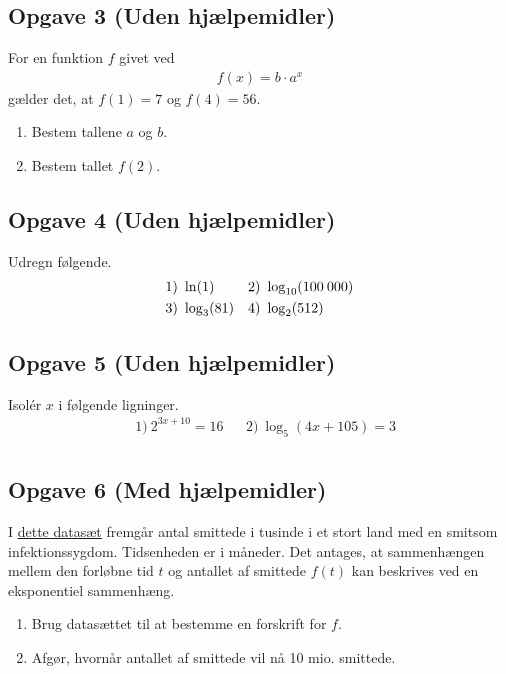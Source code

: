\documentclass[12pt]{article}
\begin{document}
\subsection*{Opgave 3 (Uden hjælpemidler)}

For en funktion $f$ givet ved 
\begin{align*}
	f(x) = b\cdot a^x
\end{align*}
gælder det, at $f(1) = 7$ og $f(4) = 56$.
\begin{enumerate}[label=\roman*)]
	\item Bestem tallene $a$ og $b$. 
	\item Bestem tallet $f(2)$.
\end{enumerate}

\subsection*{Opgave 4 (Uden hjælpemidler)}

Udregn følgende.
\begin{align*}
	&1) \   \ln(1)  &  &2) \ \log_{10}(100\hspace{0.8mm} 000)\\
	&3) \ \log_3(81)  &  &4) \ \log_{2}(512) 
\end{align*}

\subsection*{Opgave 5 (Uden hjælpemidler)}

Isolér $x$ i følgende ligninger.
\begin{align*}
	&1) \ 2^{3x + 10} = 16 &&2) \ \log_5(4x + 105) = 3 \\
\end{align*}
\subsection*{Opgave 6 (Med hjælpemidler)}

I \href{https://github.com/ChristianJLex/TeachingNotes/raw/master/2024-2025/Data og lign/Smittetal.xlsx}{\color{blue!60} dette datasæt} fremgår antal smittede i tusinde i et stort land med en smitsom infektionssygdom. Tidsenheden er i måneder. 
Det antages, at sammenhængen mellem den forløbne tid $t$ og antallet af smittede $f(t)$ kan beskrives ved en eksponentiel sammenhæng. 
\begin{enumerate}[label=\roman*)]
	\item Brug datasættet til at bestemme en forskrift for $f$. 
	\item Afgør, hvornår antallet af smittede vil nå 10 mio. smittede.
\end{enumerate} 
\end{document}
